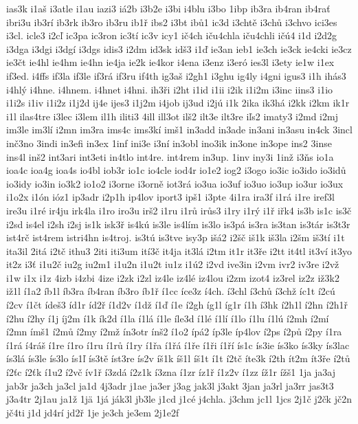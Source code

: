 {ias3k
i1aš
i3atle
i1au
iazi3
iá2b
i3b2e
i3bi
i4blu
i3bo
1ibp
ib3ra
ib4ran
ib4rať
ibri3u
ib3rí
ib3rk
ib3ro
ib3ru
ib1ř
ibs2
i3bt
ibů1
ic3d
i3chtě
i3chů
i3chvo
ici3es
i3cl.
icle3
i2cľ
ic3pa
ic3ron
ic3tí
ic3v
icy1
ič4ch
iču4chla
iču4chli
ičú4
i1d
i2d2g
i3dga
i3dgi
i3dgí
i3dgs
idis3
i2dm
id3sk
idš3
i1ď
ie3an
ieb1
ie3ch
ie3ck
ie4cki
ie3cz
ie3čt
ie4hl
ie4hm
ie4hn
ie4ja
ie2k
ie4kor
i4ena
i3enz
i3eró
ies3l
i3ety
ie1w
i1ex
if3ed.
i4ffs
if3la
if3le
if3rá
if3ru
if4th
ig3aš
i2gh1
i3ghu
ig4ly
i4gni
igus3
i1h
ihás3
i4hlý
i4hne.
i4hnem.
i4hnet
i4hni.
ih3ři
i2ht
i1id
i1ii
i2ik
i1i2m
i3inc
iins3
i1io
i1i2s
i1iv
i1i2z
i1j2d
ij4e
ijes3
i1j2m
i4job
ij3ud
i2jú
i1k
2ika
ik3há
i2kk
i2km
ik1r
i1l
ilas4tre
i3lec
i3lem
il1h
iliti3
4ill
ill3ot
ilš2
ilt3e
ilt3re
iľs2
imaty3
i2md
i2mj
im3le
im3lí
i2mn
im3ra
ims4c
ims3kí
imš1
in3add
in3ade
in3ani
in3asu
in4ck
3incl
inč3no
3indi
in3efi
in3ex
1inf
ini3e
i3ní
in3obl
ino3ik
in3one
in3ope
ins2
3inse
ins4l
inš2
int3ari
int3eti
in4tlo
int4re.
int4rem
in3up.
1inv
iny3i
1inž
i3ňs
io1a
ioa4c
ioa4g
ioa4s
io4bl
iob3r
io1c
io4cle
iod4r
io1e2
iog2
i3ogo
io3ic
io3ido
io3idů
io3idy
io3in
io3k2
io1o2
i3orne
i3orně
iot3rá
io3ua
io3uf
io3uo
io3up
io3ur
io3ux
i1o2x
i1ón
ióz1
ip3adr
i2p1h
ip4lov
iport3
ipš1
i3pte
4i1ra
ira3f
i1rá
i1re
iref3l
ire3u
i1ré
ir4ju
irk4la
i1ro
iro3u
irš2
i1ru
i1rů
irůs3
i1ry
i1rý
i1ř
iřk4
is3b
is1c
is3č
i2sd
is4el
i2sh
i2sj
is1k
isk3ř
is4kú
is3le
is4lím
is3lo
is3pá
is3ra
is3tan
is3tár
is3t3r
ist4rč
ist4rem
istri4hn
is4troj.
is3tú
is3tve
isy3p
išá2
i2šč
iš1k
iš3la
i2šm
iš3tí
i1t
ita3il
2itá
i2tč
ithu3
2iti
iti3um
ití3č
it4ja
it3lá
i2tm
it1r
it3ře
i2tt
it4tl
it3ví
it3yo
it2z
i3ť
i1u2č
iu2g
iu2m1
i1u2n
i1u2t
iu1z
i1ú2
i2vd
ive3in
i2vm
ivr2
iv3re
i2vž
i1w
i1x
i1z
4izb
i4zbi
4ize
i2zk
i2zl
iz4le
iz4lé
iz4lou
i2zm
izot4
iz3rel
iz2z
iž3k2
iž1l
í1a2
íb1l
íb3ra
íb4ran
íb3ro
íb1ř
í1cc
íce3z
í4ch.
í3chl
í3chů
í3chž
íc1t
í2cú
í2cv
í1čt
ídeš3
íd1r
íd2ř
í1d2v
í1dž
í1ď
í1e
í2gh
íg1l
íg1r
í1h
í3hk
í2h1l
í2hn
í2h1ř
í2hu
í2hy
í1j
íj2m
í1k
ík2d
í1la
í1lá
í1le
íle3d
í1lé
í1lí
í1lo
í1lu
í1lú
í2mh
í2mí
í2mn
ímš1
í2mů
í2my
í2mž
ín3otr
ínš2
í1o2
ípá2
íp3le
íp4lov
í2ps
í2pů
í2py
í1ra
í1rá
í4ráš
í1re
í1ro
í1ru
í1rů
í1ry
í1řa
í1řá
í1ře
í1ři
í1ří
ís1c
ís3ie
ís3ko
ís3ky
ís3lac
ís3lá
ís3le
ís3lo
ís1ľ
ís3tě
íst3re
ís2v
íš1k
íš1l
íš1t
í1t
í2tč
íte3k
í2th
ít2m
ít3ře
í2tů
í2ťc
í2ťk
í1u2
í2vč
ív1ř
í3zdá
í2z1k
í3zna
í1zr
íz1ř
í1z2v
í1zz
íž1r
ížš1
1ja
ja3aj
jab3r
ja3ch
ja3cl
ja1d
4j3adr
j1ae
ja3er
j3ag
jak3l
j3akt
3jan
ja3rl
ja3rr
jas3t3
j3a4tr
2j1au
ja1ž
1jä
1já
ják3l
jb3le
j1cd
j1cé
j4chla.
j3chm
jc1l
1jcs
2j1č
j2čk
jč2n
jč4ti
j1d
jd4rí
jd2ř
1je
je3ch
je3em
2j1e2f
}
